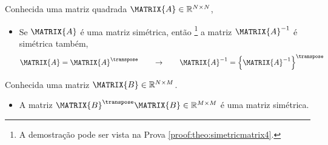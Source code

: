 \begin{theorem}\label{theo:simetricmatrix4}
Conhecida uma matriz quadrada $\MATRIX{A} \in \mathbb{R}^{N \times N}$, 
\begin{itemize}
\item Se $\MATRIX{A}$ é uma matriz simétrica, então
\footnote{A demostração pode ser vista na Prova \ref{proof:theo:simetricmatrix4}.} 
 a matriz $\MATRIX{A}^{-1}$  é simétrica também,
\begin{equation}
\MATRIX{A}=\MATRIX{A}^{\transpose}
\qquad \rightarrow \qquad
\MATRIX{A}^{-1}=\left\{\MATRIX{A}^{-1}\right\}^{\transpose}
\end{equation}
\end{itemize}
\end{theorem}

\begin{lema}\label{lema:simetricmatrix5}
Conhecida uma matriz $\MATRIX{B} \in \mathbb{R}^{N \times M}$.
\begin{itemize}
\item A matriz $\MATRIX{B}^{\transpose}\MATRIX{B} \in \mathbb{R}^{M \times M}$ é uma matriz simétrica.
\end{itemize}
\end{lema}


